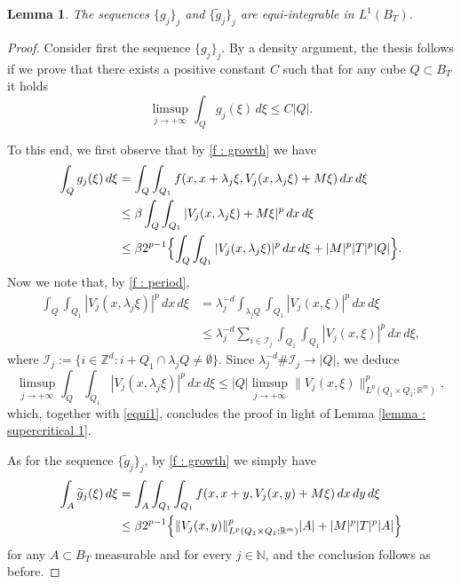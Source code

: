 \documentclass{article}
\newtheorem{lemma}{Lemma}[section]
\theoremstyle{definition}
\newcommand{\N}{\mathbb{N}}
\newcommand{\R}{\mathbb{R}}
\begin{document}
\begin{lemma}\label{lemma : supercritical 2}
    The sequences $\{g_j\}_j$ and $\{\widetilde{g}_j\}_j$ are equi-integrable in $L^1(B_T)$.
\end{lemma}
\begin{proof}
Consider first the sequence $\{g_j\}_j$. By a density argument, the thesis follows if we prove that there exists a positive constant $C$ such that for any cube $Q\subset B_T$ it holds
\begin{equation*}
  \limsup_{j\to+\infty}  \int_Q g_j(\xi)\,d\xi\leq C|Q|.
\end{equation*} 

To this end, we first observe that by \eqref{f : growth} we have
\begin{align}\notag
\int_Q g_j(\xi)\,d\xi & = \int_Q\int_{Q_1} f(x,x+\lambda_j\xi,V_j(x,\lambda_j\xi)+M\xi)\, dx\,d\xi \\ \notag
& \leq \beta \int_Q\int_{Q_1} |V_j(x,\lambda_j\xi)+M\xi|^p\, dx\,d\xi \\ \label{equi1}
& \leq \beta 2^{p-1} \Bigl\{ \int_Q\int_{Q_1} |V_j(x,\lambda_j\xi)|^p\,dx\,d\xi+ |M|^p|T|^p|Q|\Bigr\}.
\end{align}
Now we note that, by \eqref{f : period},
\begin{align*}
    \int_Q\int_{Q_1} |V_j(x,\lambda_j\xi)|^p\,dx\,d\xi & = \lambda_j^{-d}\int_{\lambda_j Q}\int_{Q_1}|V_j(x,\xi)|^p\,dx\,d\xi \\
    & \leq \lambda_j^{-d} \sum_{i\in \mathcal{I}_j} \int_{Q_1}\int_{Q_1}|V_j(x,\xi)|^p\,dx\,d\xi,
\end{align*}
where $\mathcal{I}_j:=\{i\in\mathbb Z^d : i+Q_1\cap \lambda_jQ\neq \emptyset\}$. Since $\lambda_j^{-d}\#\mathcal{I}_j\to |Q|$, we deduce
\begin{equation*}
    \limsup_{j\to+\infty}\int_Q\int_{Q_1} |V_j(x,\lambda_j\xi)|^p\,dx\,d\xi \leq  |Q|\limsup_{j\to+\infty}\|V_j(x,\xi)\|^p_{L^p(Q_1\times Q_1;\R^m)},
\end{equation*}
which, together with \eqref{equi1}, concludes the proof in light of Lemma \ref{lemma : supercritical 1}.

As for the sequence $\{\widetilde{g}_j\}_j$, by \eqref{f : growth} we simply have
\begin{align*}
\int_A \widetilde{g}_j(\xi)\,d\xi & = \int_A\int_{Q_1} \int_{Q_1} f(x,x+y,V_j(x,y)+M\xi)\, dx\, dy\,d\xi \\
& \leq \beta 2^{p-1} \Bigl\{\|V_j(x,y)\|^p_{L^p(Q_1\times Q_1;\R^m)}|A|+ |M|^p|T|^p|A|\Bigr\}
\end{align*}
for any $A\subset B_T$ measurable and for every $j\in\N$, and the conclusion follows as before.
\end{proof}
\end{document}
